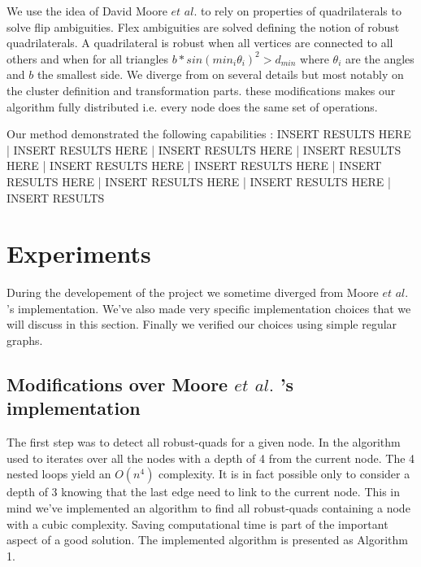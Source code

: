 \documentclass[letterpaper, 10 pt, conference]{ieeeconf}  %
\begin{document}
We use the idea of David Moore $et$ $al.$ \cite{MooreTeller} to rely on properties of quadrilaterals to solve flip ambiguities. Flex ambiguities are solved defining the notion of robust quadrilaterals. A quadrilateral is robust when all vertices are connected to all others and when for all triangles $b*sin(min_i \theta_i)^2 > d_{min} $ where $\theta_i$ are the angles and $b$ the smallest side. We diverge from \cite{MooreTeller} on several details but most notably on the cluster definition and transformation parts. these modifications makes our algorithm fully distributed i.e. every node does the same set of operations.

Our method demonstrated the following capabilities : INSERT RESULTS HERE | INSERT RESULTS HERE | INSERT RESULTS HERE | INSERT RESULTS HERE | INSERT RESULTS HERE | INSERT RESULTS HERE | INSERT RESULTS HERE | INSERT RESULTS HERE | INSERT RESULTS HERE | INSERT RESULTS  

\section{Experiments}

During the developement of the project we sometime diverged from Moore $et$ $al.$ 's implementation. We've also made very specific implementation choices that we will discuss in this section. Finally we verified our choices using simple regular graphs.

\subsection{Modifications over Moore $et$ $al.$ 's implementation}

The first step was to detect all robust-quads for a given node. In \cite{} the algorithm used to iterates over all the nodes with a depth of 4 from the current node. The 4 nested loops yield an $O(n^4)$ complexity. It is in fact possible only to consider a depth of 3 knowing that the last edge need to link to the current node. This in mind we've implemented an algorithm to find all robust-quads containing a node with a cubic complexity. Saving computational time is part of the important aspect of a good solution. The implemented algorithm is presented as Algorithm 1. 
\end{document}
